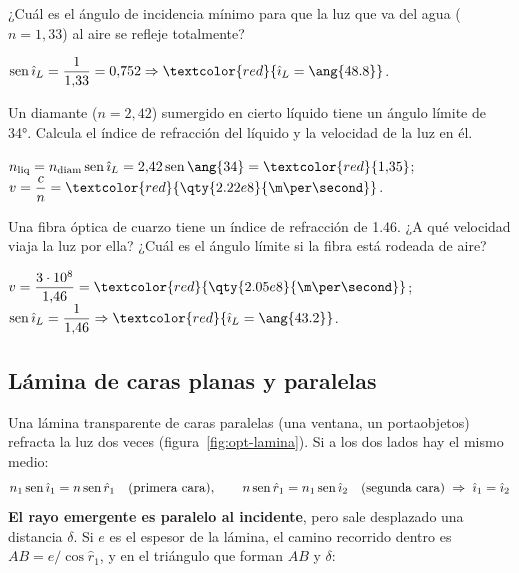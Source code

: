 \begin{exercise}
    ¿Cuál es el ángulo de incidencia mínimo para que la luz que va del agua (\(n = 1{,}33\)) al aire se refleje totalmente?
    \begin{solu}
        \(\sen\hat{\imath}_L = \dfrac{1}{1{,}33} = 0{,}752 \Rightarrow \textcolor{red}{\hat{\imath}_L = \ang{48.8}}\).
    \end{solu}
\end{exercise}

\begin{exercise}
    Un diamante (\(n = 2{,}42\)) sumergido en cierto líquido tiene un ángulo límite de \ang{34}. Calcula el índice de
    refracción del líquido y la velocidad de la luz en él.
    \begin{solu}
        \(n_{\text{liq}} = n_{\text{diam}}\sen\hat{\imath}_L = 2{,}42\sen\ang{34} = \textcolor{red}{1{,}35}\);
        \(v = \dfrac{c}{n} = \textcolor{red}{\qty{2.22e8}{\m\per\second}}\).
    \end{solu}
\end{exercise}

\begin{exercise}
    Una fibra óptica de cuarzo tiene un índice de refracción de \num{1.46}. ¿A qué velocidad viaja la luz por ella? ¿Cuál es
    el ángulo límite si la fibra está rodeada de aire?
    \begin{solu}
        \(v = \dfrac{3\cdot 10^8}{1{,}46} = \textcolor{red}{\qty{2.05e8}{\m\per\second}}\);
        \(\sen\hat{\imath}_L = \dfrac{1}{1{,}46} \Rightarrow \textcolor{red}{\hat{\imath}_L = \ang{43.2}}\).
    \end{solu}
\end{exercise}

\subsection{Lámina de caras planas y paralelas}\label{subsec:opt-lamina}

Una lámina transparente de caras paralelas (una ventana, un portaobjetos) refracta la luz dos veces
(figura~\ref{fig:opt-lamina}). Si a los dos lados hay el mismo medio:
\begin{equation*}
    n_1\operatorname{sen}\hat{\imath}_1 = n\operatorname{sen}\hat r_1 \quad\text{(primera cara)}, \qquad n\operatorname{sen}\hat r_1 = n_1\operatorname{sen}\hat{\imath}_2 \quad\text{(segunda cara)}
    \;\Rightarrow\; \hat{\imath}_1 = \hat{\imath}_2
\end{equation*}
\textbf{El rayo emergente es paralelo al incidente}, pero sale desplazado una distancia \(\delta\). Si \(e\) es el espesor de
la lámina, el camino recorrido dentro es \(AB = e/\cos\hat r_1\), y en el triángulo que forman \(AB\) y \(\delta\):
\begin{centeredequation}
     \label{eq:opt-lamina}
\end{centeredequation}

